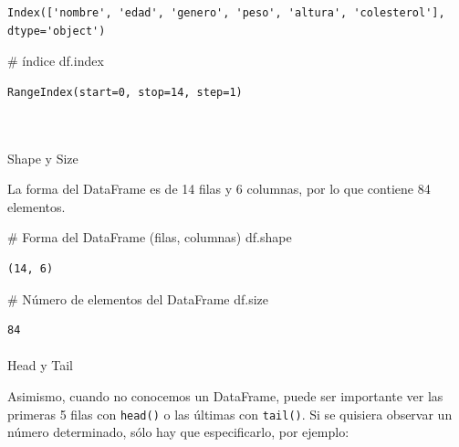 \documentclass[
  letterpaper,
  DIV=11,
  numbers=noendperiod]{scrreprt}
\makeatletter
\let\oldparagraph\paragraph
\renewcommand{\paragraph}{
    \@ifstar
      \xxxParagraphStar
      \xxxParagraphNoStar
  }
\newcommand{\xxxParagraphStar}[1]{\oldparagraph*{#1}\mbox{}}
\newcommand{\xxxParagraphNoStar}[1]{\oldparagraph{#1}\mbox{}}
\newenvironment{Shaded}{\begin{snugshade}}{\end{snugshade}}
\newcommand{\CommentTok}[1]{\textcolor[rgb]{0.37,0.37,0.37}{#1}}
\newcommand{\NormalTok}[1]{\textcolor[rgb]{0.00,0.23,0.31}{#1}}
\makeatother
\begin{document}
\begin{verbatim}
Index(['nombre', 'edad', 'genero', 'peso', 'altura', 'colesterol'], dtype='object')
\end{verbatim}

\begin{Shaded}
\begin{Highlighting}[]
\CommentTok{\# índice}
\NormalTok{df.index}
\end{Highlighting}
\end{Shaded}

\begin{verbatim}
RangeIndex(start=0, stop=14, step=1)
\end{verbatim}

~

\paragraph{Shape y Size}\label{shape-y-size}

La forma del DataFrame es de 14 filas y 6 columnas, por lo que contiene
84 elementos.

\begin{Shaded}
\begin{Highlighting}[]
\CommentTok{\# Forma del DataFrame (filas, columnas)}
\NormalTok{df.shape}
\end{Highlighting}
\end{Shaded}

\begin{verbatim}
(14, 6)
\end{verbatim}

\begin{Shaded}
\begin{Highlighting}[]
\CommentTok{\# Número de elementos del DataFrame}
\NormalTok{df.size}
\end{Highlighting}
\end{Shaded}

\begin{verbatim}
84
\end{verbatim}

\hfill\break

\paragraph{Head y Tail}\label{head-y-tail}

Asimismo, cuando no conocemos un DataFrame, puede ser importante ver las
primeras 5 filas con \texttt{head()} o las últimas con \texttt{tail()}.
Si se quisiera observar un número determinado, sólo hay que
especificarlo, por ejemplo:
\end{document}
